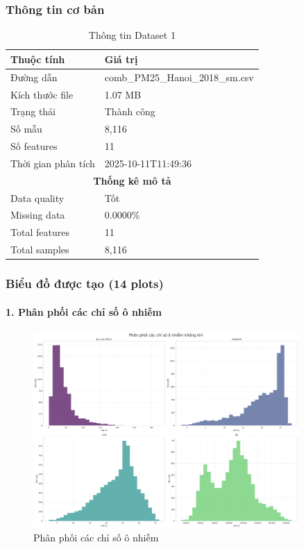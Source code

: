 \documentclass[12pt,a4paper]{article}
\begin{document}
\subsubsection{Thông tin cơ bản}
\begin{table}[H]
\centering
\begin{tabular}{ll}
\toprule
\textbf{Thuộc tính} & \textbf{Giá trị}\\
\midrule
Đường dẫn & comb\_PM25\_Hanoi\_2018\_sm.csv\\
Kích thước file & 1.07 MB\\
Trạng thái & \textcolor{successcolor}{Thành công}\\
Số mẫu & 8,116\\
Số features & 11\\
Thời gian phân tích & 2025-10-11T11:49:36\\
\midrule
\multicolumn{2}{c}{\textbf{Thống kê mô tả}}\\
\midrule
Data quality & Tốt\\
Missing data & 0.0000\%\\
Total features & 11\\
Total samples & 8,116\\
\bottomrule
\end{tabular}
\caption{Thông tin Dataset 1}
\end{table}

\subsubsection{Biểu đồ được tạo (14 plots)}

\paragraph{1. Phân phối các chỉ số ô nhiễm}

\begin{figure}[H]
\centering
\includegraphics[width=0.9\textwidth]{results_comb_PM25_Hanoi_2018_sm_20251011_121424/20251011_121424_phan_phoi_chi_so.png}
\caption{Phân phối các chỉ số ô nhiễm}
\end{figure}
\end{document}
